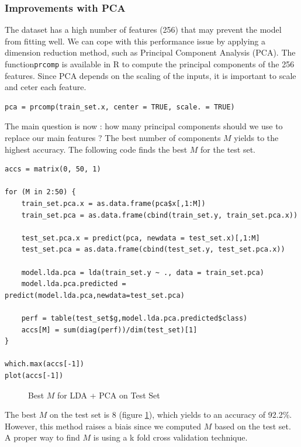 \documentclass[]{report}
\newcommand{\inputtikz}[2]{%
	\scalebox{#1}{}  
}
\begin{document}
\subsubsection{Improvements with PCA}
The dataset has a high number of features (256) that may prevent the model from fitting well. We can cope with this performance issue by applying a dimension reduction method, such as Principal Component Analysis (PCA). The function\texttt{prcomp} is available in R to compute the principal components of the 256 features. Since PCA depends on the scaling of the inputs, it is important to scale and ceter each feature.
\begin{lstlisting}
pca = prcomp(train_set.x, center = TRUE, scale. = TRUE)
\end{lstlisting}

The main question is now : how many principal components should we use to replace our main features ? The best number of components $M$ yields to the highest accuracy. The following code finds the best $M$ for the test set.

\begin{lstlisting}
accs = matrix(0, 50, 1)

for (M in 2:50) {
	train_set.pca.x = as.data.frame(pca$x[,1:M])
	train_set.pca = as.data.frame(cbind(train_set.y, train_set.pca.x))
	
	test_set.pca.x = predict(pca, newdata = test_set.x)[,1:M]
	test_set.pca = as.data.frame(cbind(test_set.y, test_set.pca.x))
	
	model.lda.pca = lda(train_set.y ~ ., data = train_set.pca)
	model.lda.pca.predicted = predict(model.lda.pca,newdata=test_set.pca)
	
	perf = table(test_set$g,model.lda.pca.predicted$class)
	accs[M] = sum(diag(perf))/dim(test_set)[1]
}

which.max(accs[-1])
plot(accs[-1])
\end{lstlisting}

\begin{figure}[!hb]
	\centering
	\inputtikz{0.5}{Figures/lda_pca.tex}
	\caption{Best $M$ for LDA + PCA on Test Set}
	\label{fig:lda_pca}
\end{figure}

The best $M$ on the test set is 8 (figure \ref{fig:lda_pca}), which yields to an accuracy of 92.2\%. However, this method raises a biais since we computed $M$ based on the test set. A proper way to find $M$ is using a k fold cross validation technique.
\end{document}
